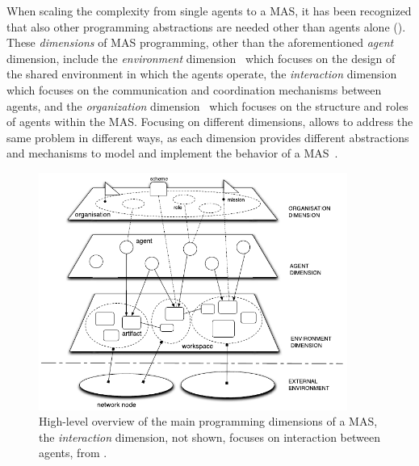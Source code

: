 When scaling the complexity from single agents to a \ac{MAS}, it has been recognized that also other programming abstractions are needed other than agents alone (). 
%
These \emph{dimensions} of \ac{MAS} programming, 
other than the aforementioned \emph{agent} dimension,
include the \emph{environment} dimension~\cite{Weyns_Omicini_Odell_2007} which focuses on the design of the shared environment in which the agents operate,
the \emph{interaction} dimension~\cite{Huhns_2001} which focuses on the communication and coordination mechanisms between agents,
and the \emph{organization} dimension~\cite{Boissier_Hübner_Sichman_2007} which focuses on the structure and roles of agents within the \ac{MAS}.
%
Focusing on different dimensions, allows to address the same problem in different ways, as each dimension provides different abstractions and mechanisms to model and implement the behavior of a \ac{MAS}~\cite{Boissier_Bordini_Hübner_Ricci_2019}.

\begin{figure}[t]
    \centering
    \includegraphics[width=0.9\textwidth]{figures/mas-dimensions-overview.pdf}
    \caption{High-level overview of the main programming dimensions of a \ac{MAS}, the \emph{interaction} dimension, not shown, focuses on interaction between agents, from \cite{Boissier_Bordini_Hübner_Ricci_Santi_2013}.}
    \label{fig:mas-dimensions-overview}
\end{figure}


